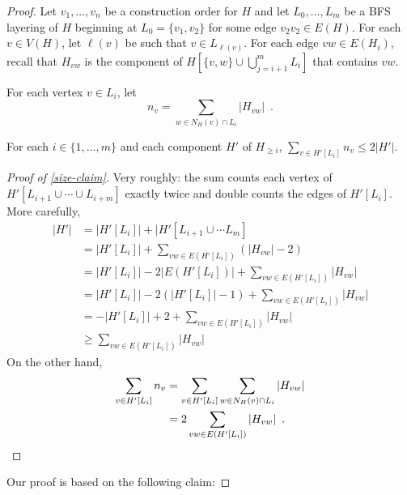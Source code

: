 \documentclass[kpfonts]{patmorin}
\begin{document}
\begin{proof}
    Let $v_1,\ldots,v_n$ be a construction order for $H$ and
    let $L_0,\ldots,L_m$ be a BFS layering of $H$ beginning at  $L_0=\{v_1,v_2\}$ for some edge $v_2v_2\in E(H)$.  For each $v\in V(H)$, let $\ell(v)$ be such that $v\in L_{\ell(v)}$.  For each edge $vw\in E(H_i)$, recall that $H_{vw}$ is the component of $H[\{v,w\}\cup\bigcup_{j=i+1}^m L_i]$ that contains $vw$.

    For each vertex $v\in L_i$, let
    \begin{equation}
        n_v=\sum_{w\in N_H(v)\cap L_i}|H_{vw}| \enspace . \label{nv}
    \end{equation}

    \begin{clm}\label{size-claim}
        For each $i\in\{1,\ldots,m\}$ and each component $H'$ of $H_{\ge i}$, $\sum_{v\in H'[L_i]} n_v \le 2|H'|$.
    \end{clm}

    \begin{proof}[Proof of \cref{size-claim}]
        Very roughly: the sum counts each vertex of $H'[L_{i+1}\cup\cdots\cup L_{i+m}]$ exactly twice and double counts the edges of $H'[L_i]$.
        More carefully,
        \begin{align*} |H'|
            & = |H'[L_{i}]| + |H'[L_{i+1}\cup\cdots L_{m}] \\
            & = |H'[L_i]|+\sum_{vw\in E(H'[L_i])} (|H_{vw}|-2) \\
            & = |H'[L_i]|-2|E(H'[L_i])| + \sum_{vw\in E(H'[L_i])} |H_{vw}| \\
            & = |H'[L_i]|-2(|H'[L_i]|-1) + \sum_{vw\in E(H'[L_i])} |H_{vw}| \\
            & = -|H'[L_i]|+2 + \sum_{vw\in E(H'[L_i])} |H_{vw}| \\
            & \ge \sum_{vw\in E(H'[L_i])} |H_{vw}|
        \end{align*}
        On the other hand,
        \begin{align*}
            \sum_{v\in H'[L_i]} n_v
            & = \sum_{v\in H'[L_i]}\sum_{w\in N_H(v)\cap L_i}|H_{vw}| \\
            & = 2 \sum_{vw\in E(H'[L_i])} |H_{vw}| \enspace . \qedhere
        \end{align*}
    \end{proof}

Our proof is based on the following claim:


\end{proof}
\end{document}
